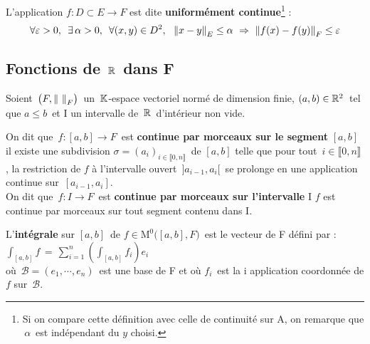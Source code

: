 \vspace{1.3cm}

L'application \(f:D\subset E\to F\) est dite \textbf{uniformément continue}\footnote{Si on compare cette définition avec celle de continuité sur A, on remarque que $\,\alpha\,$ est indépendant du $y$ choisi.} \ssi : \vspace{-0.25cm} \[\forall \varepsilon >0,\ \,\exists\, \alpha>0,\ \, \forall(x,y)\in D^2,\ \ \norm{x-y}_E\leq \alpha \ \Rightarrow \ \norm{f(x)-f(y)}_F\leq \varepsilon\]

\vspace{1cm}

\subsection{Fonctions de $\,\mathbb{R}\,$ dans F}

\vspace*{0.5cm}

\begin{center}
    Soient \(\,\bigl(F,\norm{\ }_F\bigr)\,\) un $\,\mathbb{K}$-espace vectoriel normé de dimension finie, \((a,b)\in\mathbb{R}^2\,\) tel que \(a\leq b\,\) et I un intervalle de $\,\mathbb{R}\,$ d'intérieur non vide.
\end{center}

\vspace{0.7cm}

On dit que \(\,f:[a,b]\to F\, \) est \textbf{continue par morceaux sur le segment} $[a,b]$ \ssi il existe une subdivision \(\sigma =(a_i)_{i\in \llbracket 0,n \rrbracket}\,\) de \([a,b]\) telle que pour tout \(\,i\in \llbracket 0,n \rrbracket\,\), la restriction de $f$ à l'intervalle ouvert \(\,]a_{i-1},a_i[\,\) se prolonge en une application continue sur \(\,[a_{i-1},a_i].\)\vspace{0.3cm}\\
On dit que \(\,f:I\to F\,\) est \textbf{continue par morceaux sur l'intervalle} I \ssi $f$ est continue par morceaux sur tout segment contenu dans I.

\vspace{1.3cm}

\noindent L'\textbf{intégrale} sur \([a,b]\,\) de \(f\in\text{M}^0\bigl([a,b],F\bigr)\,\) est le vecteur de F défini par :
\(\displaystyle \int_{[a,b]}\!\!f\,=\,\sum_{i=1}^{n}\!\left(\int_{[a,b]}\!\!f_i\right)\!e_i\)\vspace{0.3cm}\\
où \(\,\mathcal{B}=(e_1,\cdots,e_n)\,\) est une base de F et où $f_i\,$ est la i application coordonnée de $f$ sur \(\,\mathcal{B}.\)

